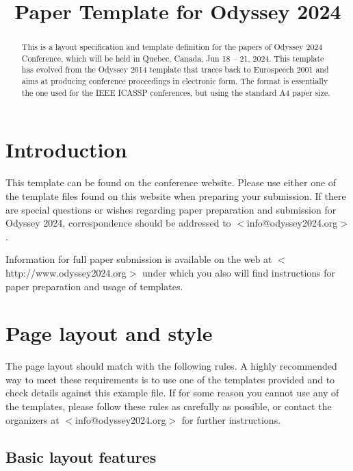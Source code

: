 \documentclass[a4paper]{article}
\title{Paper Template for Odyssey 2024}
\begin{document}
\maketitle

%
\begin{abstract}
This is a layout specification and template definition for the
papers of Odyssey 2024 Conference, which will be held in Quebec,
Canada, Jun 18 -- 21, 2024. This template has evolved from
the Odyssey 2014 template that traces back to Eurospeech 2001 and
aims at producing conference proceedings in electronic form.
The format is essentially the one used for the IEEE ICASSP conferences, but using the standard A4 paper size.
\end{abstract}

%
\section{Introduction}
This template can be found on the conference website. Please use
either one of the template files found on this website when preparing your
submission. If there are special questions or wishes regarding
paper preparation and submission for Odyssey 2024, correspondence
should be addressed to \mbox{$<$info@odyssey2024.org$>$.}

Information for full paper submission is available on the web at
$<$http://www.odyssey2024.org$>$ under which you also will find
instructions for paper preparation and usage of templates.

\section{Page layout and style}

The page layout should match with the following rules. A highly
recommended way to meet these requirements is to use one of the
templates provided and to check details against this example
file. If for some reason you cannot use any of the templates, please
follow these rules as carefully as possible, or contact the
organizers at \mbox{$<$info@odyssey2024.org$>$} for further
instructions.

\subsection{Basic layout features}
\end{document}

